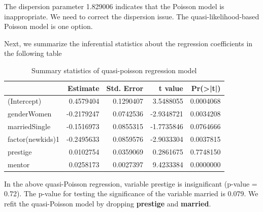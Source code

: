 \documentclass[
]{book}
\newenvironment{Shaded}{\begin{snugshade}}{\end{snugshade}}
\newcommand{\AttributeTok}[1]{\textcolor[rgb]{0.13,0.29,0.53}{#1}}
\newcommand{\FloatTok}[1]{\textcolor[rgb]{0.00,0.00,0.81}{#1}}
\newcommand{\FunctionTok}[1]{\textcolor[rgb]{0.13,0.29,0.53}{\textbf{#1}}}
\newcommand{\NormalTok}[1]{#1}
\newcommand{\OtherTok}[1]{\textcolor[rgb]{0.56,0.35,0.01}{#1}}
\newcommand{\SpecialCharTok}[1]{\textcolor[rgb]{0.81,0.36,0.00}{\textbf{#1}}}
\newcommand{\StringTok}[1]{\textcolor[rgb]{0.31,0.60,0.02}{#1}}
\begin{document}
The dispersion parameter 1.829006 indicates that the Poisson model is inappropriate. We need to correct the dispersion issue. The quasi-likelihood-based Poisson model is one option.

Next, we summarize the inferential statistics about the regression coefficients in the following table

\begin{Shaded}
\end{Shaded}

\begin{table}

\caption{\label{tab:unnamed-chunk-167}Summary statistics of quasi-poisson regression model}
\centering
\begin{tabular}[t]{l|r|r|r|r}
\hline
  & Estimate & Std. Error & t value & Pr(>|t|)\\
\hline
(Intercept) & 0.4579404 & 0.1290407 & 3.5488055 & 0.0004068\\
\hline
genderWomen & -0.2179247 & 0.0742536 & -2.9348721 & 0.0034208\\
\hline
marriedSingle & -0.1516973 & 0.0855315 & -1.7735846 & 0.0764666\\
\hline
factor(newkids)1 & -0.2495633 & 0.0859576 & -2.9033304 & 0.0037815\\
\hline
prestige & 0.0102754 & 0.0359069 & 0.2861675 & 0.7748150\\
\hline
mentor & 0.0258173 & 0.0027397 & 9.4233384 & 0.0000000\\
\hline
\end{tabular}
\end{table}

In the above quasi-Poisson regression, variable prestige is insignificant (p-value = 0.72). The p-value for testing the significance of the variable married is 0.079. We refit the quasi-Poisson model by dropping \textbf{prestige} and \textbf{married}.

\begin{Shaded}
\end{Shaded}
\end{document}
